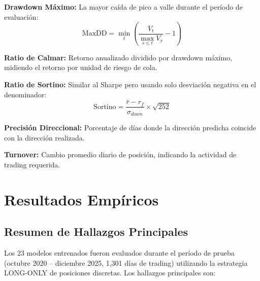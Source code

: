 \documentclass[11pt,a4paper]{article}
\begin{document}
\textbf{Drawdown Máximo:} La mayor caída de pico a valle durante el período de evaluación:
\begin{equation}
\text{MaxDD} = \min_t \left( \frac{V_t}{\max_{s \leq t} V_s} - 1 \right)
\end{equation}

\textbf{Ratio de Calmar:} Retorno anualizado dividido por drawdown máximo, midiendo el retorno por unidad de riesgo de cola.

\textbf{Ratio de Sortino:} Similar al Sharpe pero usando solo desviación negativa en el denominador:
\begin{equation}
\text{Sortino} = \frac{\bar{r} - r_f}{\sigma_{down}} \times \sqrt{252}
\end{equation}

\textbf{Precisión Direccional:} Porcentaje de días donde la dirección predicha coincide con la dirección realizada.

\textbf{Turnover:} Cambio promedio diario de posición, indicando la actividad de trading requerida.

\section{Resultados Empíricos}

\subsection{Resumen de Hallazgos Principales}

Los 23 modelos entrenados fueron evaluados durante el período de prueba (octubre 2020 -- diciembre 2025, 1,301 días de trading) utilizando la estrategia LONG-ONLY de posiciones discretas. Los hallazgos principales son:
\end{document}
